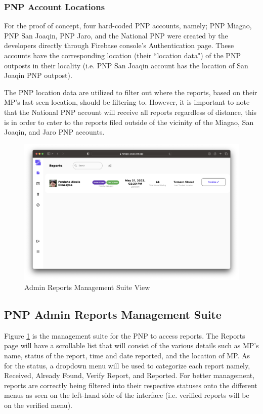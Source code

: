 \subsubsection{PNP Account Locations}

For the proof of concept, four hard-coded PNP accounts, namely; PNP Miagao, PNP San Joaqin, PNP Jaro, and the National PNP were created by the developers directly through Firebase console's Authentication page. These accounts have the corresponding location (their ``location data") of the PNP outposts in their locality (i.e. PNP San Joaqin account has the location of San Joaqin PNP outpost). 

The PNP location data are utilized to filter out where the reports, based on their MP's last seen location, should be filtering to. However, it is important to note that the National PNP account will receive all reports regardless of distance, this is in order to cater to the reports filed outside of the vicinity of the Miagao, San Joaqin, and  Jaro PNP accounts.

\begin{figure}[!h]
    \centering
    \includegraphics[scale=0.25]{figures/Chapter4/PNP/Pending.png}
    \caption{Admin Reports Management Suite View}
    \label{fig:PNP2}
\end{figure}
\subsection{PNP Admin Reports Management Suite}

Figure \ref{fig:PNP2} is the management suite for the PNP to access reports. The Reports page will have a scrollable list that will consist of the various details such as MP’s name, status of the report, time and date reported, and the location of MP. As for the status, a dropdown menu will be used to categorize each report namely, Received, Already Found, Verify Report, and Reported. For better management, reports are correctly being filtered into their respective statuses onto the different menus as seen on the left-hand side of the interface (i.e. verified reports will be on the verified menu).


